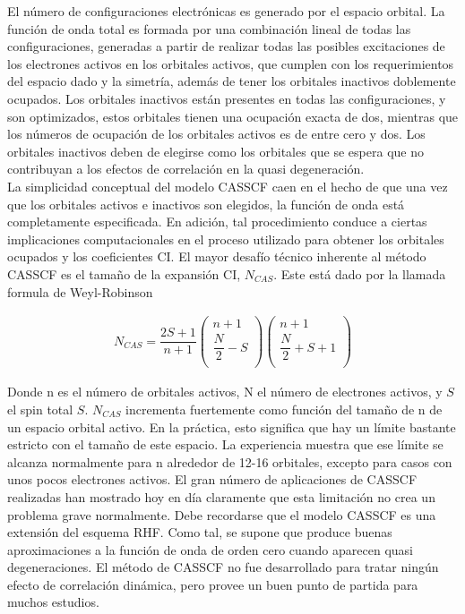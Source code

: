 \documentclass[12pt]{report}
\begin{document}
El número de configuraciones electrónicas es generado por el espacio orbital. La función de onda total es formada por una combinación lineal de todas las configuraciones, generadas a partir de realizar todas las posibles excitaciones de los electrones activos en los orbitales activos, que cumplen con los requerimientos del espacio dado y la simetría, además de tener los orbitales inactivos doblemente ocupados.  Los orbitales inactivos están presentes en todas las configuraciones, y son optimizados, estos orbitales tienen una ocupación exacta de dos, mientras que los números de ocupación de los orbitales activos es de entre cero y dos. Los orbitales inactivos deben de elegirse como los orbitales que se espera que no contribuyan a los efectos de correlación en la quasi degeneración.
\\



La simplicidad conceptual del modelo CASSCF caen en el hecho de que una vez que los orbitales activos e inactivos son elegidos, la función de onda está completamente especificada. En adición, tal procedimiento conduce a ciertas implicaciones computacionales en el proceso utilizado para obtener los orbitales ocupados y los coeficientes CI. El mayor desafío técnico inherente al método CASSCF es el tamaño de la expansión CI, $N_{CAS}$. Este está dado por la llamada formula de Weyl-Robinson\cite{Pauncz2018}




\begin{align}
N_{CAS}=\dfrac{2S+1}{n+1}\left(
\begin{matrix}
n+1  \\
\dfrac{N}{2}-S \\
\end{matrix}
\right)\left(
\begin{matrix}
n+1  \\
\dfrac{N}{2}+S+1 \\
\end{matrix}
\right)
\end{align}


Donde n es el número de orbitales activos, N el número de electrones activos, y $S$ el spin total $S$. $N_{CAS}$ incrementa fuertemente como función del tamaño de n de un espacio orbital activo. En la práctica, esto significa que hay un límite bastante estricto con el tamaño de este espacio. La experiencia muestra que ese límite se alcanza normalmente para n alrededor de 12-16 orbitales, excepto para casos con unos pocos electrones activos. El gran número de aplicaciones de CASSCF realizadas han mostrado hoy en día claramente que esta limitación no crea un problema grave normalmente. Debe recordarse que el modelo CASSCF es una extensión del esquema RHF. Como tal, se supone que produce buenas aproximaciones a la función de onda de orden cero cuando aparecen quasi degeneraciones. El método de CASSCF no fue desarrollado para tratar ningún efecto de correlación dinámica, pero provee un buen punto de partida para muchos estudios.
\\
\end{document}
